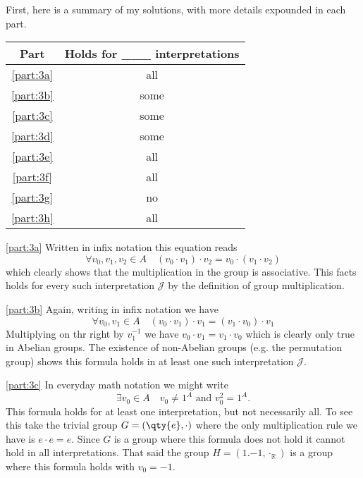 \documentclass[boxes,pages,color=CornflowerBlue]{homework}
\begin{document}
\begin{solution}
    First, here is a summary of my solutions, with more details expounded in each part.
    \begin{table}[h]
        \centering\begin{tabular}{cc}
            Part          & Holds for \_\_\_ interpretations \\ \toprule
            \ref{part:3a} & all                              \\
            \ref{part:3b} & some                             \\
            \ref{part:3c} & some                             \\
            \ref{part:3d} & some                             \\
            \ref{part:3e} & all                              \\
            \ref{part:3f} & all                              \\
            \ref{part:3g} & no                               \\
            \ref{part:3h} & all                              \\
        \end{tabular}
    \end{table}

    \ref{part:3a}
    Written in infix notation this equation reads
    \begin{equation*}
        \forall v_0, v_1, v_2 \in A \quad (v_0 \cdot v_1) \cdot v_2 = v_0 \cdot (v_1 \cdot v_2)
    \end{equation*}
    which clearly shows that the multiplication in the group is associative.
    This facts holds for every such interpretation $\mathcal{J}$ by the definition of group multiplication.

    \ref{part:3b}
    Again, writing in infix notation we have
    \begin{equation*}
        \forall v_0, v_1 \in A \quad (v_0 \cdot v_1) \cdot v_1 = (v_1 \cdot v_0) \cdot v_1
    \end{equation*}
    Multiplying on thr right by $v_1^{-1}$ we have $v_0\cdot v_1 = v_1 \cdot v_0$ which is clearly only true in Abelian groups.
    The existence of non-Abelian groups (e.g. the permutation group) shows this formula holds in at least one such interpretation $\mathcal{J}$.

    \ref{part:3c}
    In everyday math notation we might write
    \begin{equation*}
        \exists v_0 \in A \quad v_0 \neq 1^A \text{ and } v_0^2 = 1^A.
    \end{equation*}
    This formula holds for at least one interpretation, but not necessarily all.
    To see this take the trivial group $G = (\qty{e}, \cdot)$ where the only multiplication rule we have is $e \cdot e = e$.
    Since $G$ is a group where this formula does not hold it cannot hold in all interpretations.
    That said the group $H = (\qty{1, -1}, \cdot_\mathbb{R})$ is a group where this formula holds with $v_0 = -1$.


\end{solution}
\end{document}
